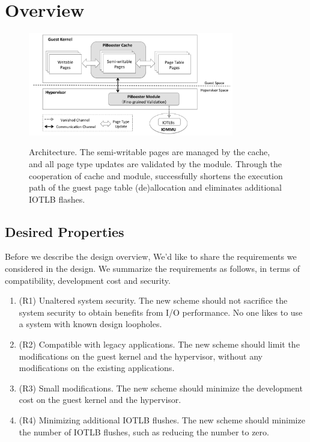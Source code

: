 \section{\name Overview} \label{sec:overview}
\begin{figure}[ht]
\centering
\includegraphics[width=0.8\textwidth]{image/overview/arch.pdf} \\
\caption{\name Architecture. The semi-writable pages are managed by the \name cache, and all page type updates are validated by the \name module.
Through the cooperation of \name cache and \name module, \name successfully shortens the execution path of the guest page table (de)allocation and eliminates additional IOTLB flashes.}
\label{fig:arch}
\end{figure}

\subsection{Desired Properties}\label{sec:req}
Before we describe the design overview, We'd like to share the requirements we considered in the design.
We summarize the requirements as follows, in terms of compatibility, development cost and security.
\begin{enumerate}
\item (R1) Unaltered system security. The new scheme should not sacrifice the system security to obtain benefits from I/O performance. No one likes to use a system with known design loopholes.
\item (R2) Compatible with legacy applications. The new scheme should limit the modifications on the guest kernel and the hypervisor, without any modifications on the existing applications.
\item (R3) Small modifications. The new scheme should minimize the development cost on the guest kernel and the hypervisor.
\item (R4) Minimizing additional IOTLB flushes. The new scheme should minimize the number of IOTLB flushes, such as reducing the number to zero.
\end{enumerate}

